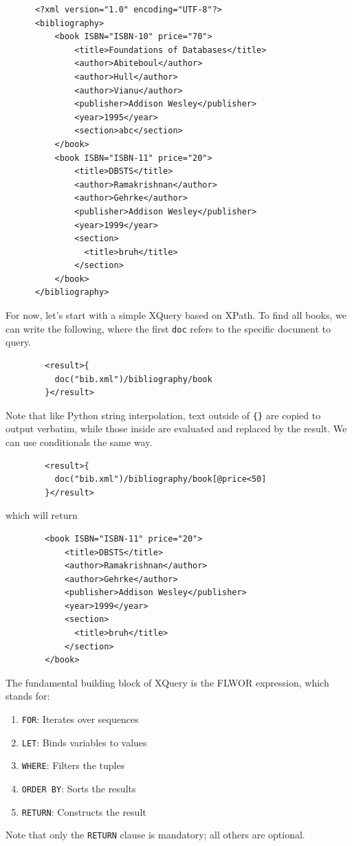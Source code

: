 \documentclass{article}
\begin{document}
    \begin{lstlisting}
      <?xml version="1.0" encoding="UTF-8"?>
      <bibliography>
          <book ISBN="ISBN-10" price="70">
              <title>Foundations of Databases</title>
              <author>Abiteboul</author>
              <author>Hull</author>
              <author>Vianu</author>
              <publisher>Addison Wesley</publisher>
              <year>1995</year>
              <section>abc</section>
          </book>
          <book ISBN="ISBN-11" price="20">
              <title>DBSTS</title>
              <author>Ramakrishnan</author>
              <author>Gehrke</author>
              <publisher>Addison Wesley</publisher>
              <year>1999</year>
              <section>
                <title>bruh</title>
              </section>
          </book>
      </bibliography> 
    \end{lstlisting}

    \begin{example}
      For now, let's start with a simple XQuery based on XPath. To find all books, we can write the following, where the first \texttt{doc} refers to the specific document to query.
      \begin{lstlisting}
        <result>{
          doc("bib.xml")/bibliography/book
        }</result>
      \end{lstlisting}
      Note that like Python string interpolation, text outside of \texttt{\{\}} are copied to output verbatim, while those inside are evaluated and replaced by the result. We can use conditionals the same way. 
      \begin{lstlisting}
        <result>{
          doc("bib.xml")/bibliography/book[@price<50]
        }</result>
      \end{lstlisting}
      which will return 
      \begin{lstlisting}
        <book ISBN="ISBN-11" price="20">
            <title>DBSTS</title>
            <author>Ramakrishnan</author>
            <author>Gehrke</author>
            <publisher>Addison Wesley</publisher>
            <year>1999</year>
            <section>
              <title>bruh</title>
            </section>
        </book>
      \end{lstlisting}
    \end{example}

    \begin{definition}
      The fundamental building block of XQuery is the FLWOR expression, which stands for:
      \begin{enumerate}
        \item \texttt{FOR}: Iterates over sequences
        \item \texttt{LET}: Binds variables to values
        \item \texttt{WHERE}: Filters the tuples
        \item \texttt{ORDER BY}: Sorts the results
        \item \texttt{RETURN}: Constructs the result
      \end{enumerate}
      Note that only the \texttt{RETURN} clause is mandatory; all others are optional.
    \end{definition}
\end{document}
